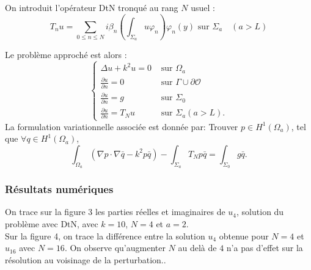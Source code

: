 \documentclass{article}
\begin{document}
On introduit l'opérateur DtN tronqué au rang $N$ usuel : $$T_n u=\sum_{0 \leq n \leq N} i \beta_n\left(\int_{\Sigma_a} u \varphi_n\right) \varphi_n(y) \text { sur } \Sigma_a \quad (a>L) $$

Le problème approché est alors :
$$
\begin{cases} \displaystyle \Delta u+k^2 u=0 & \text { sur } \Omega_a \\[0.2cm] \displaystyle  \frac{\partial u}{\partial n}=0 & \text { sur } \Gamma \cup \partial \mathcal{O} \\[0.4cm] \displaystyle  \frac{\partial u}{\partial n}=g & \text { sur } \Sigma_0 \\[0.4cm] \displaystyle  \frac{\partial u}{\partial n}=T_Nu & \text { sur } \Sigma_a(a>L) .\end{cases}
$$
La formulation variationnelle associée est donnée par: \bigbreak
Trouver $p \in H^1\left(\Omega_a\right)$, tel que $\forall q \in H^1\left(\Omega_a\right)$,
$$
\int_{\Omega_a}\left(\nabla p \cdot \nabla \bar{q}-k^2 p \bar{q}\right)-\int_{\Sigma_a}T_N p\bar{q}=\int_{\Sigma_{0}} g \bar{q} .
$$ 

\subsubsection{Résultats numériques}

On trace sur la figure 3 les parties réelles et imaginaires de $u_4$, solution du problème avec DtN, avec $k=10$, $N=4$ et $a=2$. \\
Sur la figure 4, on trace la différence entre la solution $u_4$ obtenue pour $N=4$ et $u_{16}$ avec $N=16$. On observe qu'augmenter $N$ au delà de $4$ n'a pas d'effet sur la résolution au voisinage de la perturbation..
\end{document}
